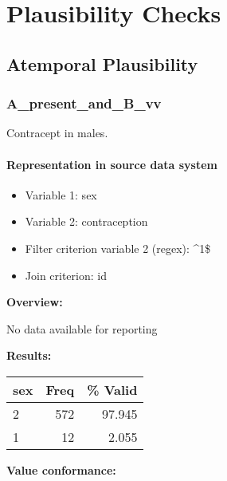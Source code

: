 \documentclass[
]{article}
\providecommand{\tightlist}{%
  \setlength{\itemsep}{0pt}\setlength{\parskip}{0pt}}
\begin{document}
\newpage

\hypertarget{plausibility-checks}{%
\section{Plausibility Checks}\label{plausibility-checks}}

\hypertarget{atemporal-plausibility}{%
\subsection{Atemporal Plausibility}\label{atemporal-plausibility}}

\hypertarget{a_present_and_b_vv}{%
\subsubsection{A\_present\_and\_B\_vv}\label{a_present_and_b_vv}}

Contracept in males.

\hypertarget{representation-in-source-data-system-29}{%
\paragraph{Representation in source data
system}\label{representation-in-source-data-system-29}}

\begin{itemize}
\tightlist
\item
  Variable 1: sex
\item
  Variable 2: contraception
\item
  Filter criterion variable 2 (regex): \^{}1\$
\item
  Join criterion: id
\end{itemize}

\textbf{Overview:}

No data available for reporting

\textbf{Results:}\\

\begin{table}[H]
\centering
\begin{tabular}{l|r|r}
\hline
\textbf{sex} & \textbf{Freq} & \textbf{\% Valid}\\
\hline
2 & 572 & 97.945\\
\hline
1 & 12 & 2.055\\
\hline
\end{tabular}
\end{table}

\textbf{Value conformance:}
\end{document}
